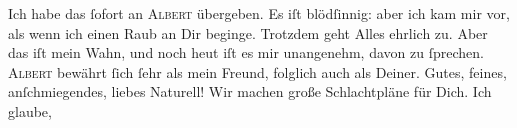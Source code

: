 \pstart
           Ich habe das \label{K_L02621-2v}\label{K_L02621-2}{ }ſofort an
                  \textsc{Albert} übergeben. Es iſt blödſinnig: aber ich kam mir vor, als wenn ich einen Raub an
               Dir beginge. Trotzdem geht Alles ehrlich zu. Aber das iſt mein Wahn, und noch heut{ }{\pb}iſt es mir unangenehm, davon zu{ }ſprechen. \textsc{Albert} bewährt{ }ſich{ }ſehr als mein Freund, folglich auch als Deiner. Gutes, feines,
               anſchmiegendes, liebes Naturell! Wir machen große Schlachtpläne für Dich. Ich glaube,
